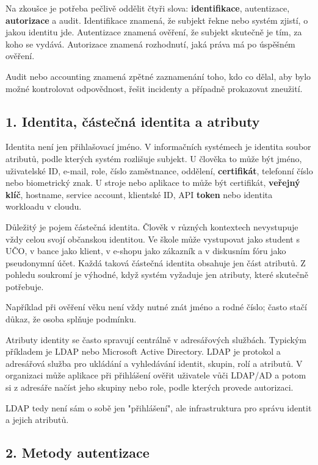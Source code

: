 \documentclass[11pt,a4paper]{article}
\begin{document}
Na zkoušce je potřeba pečlivě oddělit čtyři slova: \textbf{identifikace}, autentizace, \textbf{autorizace} a audit. Identifikace znamená, že subjekt řekne nebo systém zjistí, o jakou identitu jde. Autentizace znamená ověření, že subjekt skutečně je tím, za koho se vydává. Autorizace znamená rozhodnutí, jaká práva má po úspěšném ověření.

Audit nebo accounting znamená zpětné zaznamenání toho, kdo co dělal, aby bylo možné kontrolovat odpovědnost, řešit incidenty a případně prokazovat zneužití.

\subsection*{1. Identita, částečná identita a atributy}

Identita není jen přihlašovací jméno. V informačních systémech je identita soubor atributů, podle kterých systém rozlišuje subjekt. U člověka to může být jméno, uživatelské ID, e-mail, role, číslo zaměstnance, oddělení, \textbf{certifikát}, telefonní číslo nebo biometrický znak. U stroje nebo aplikace to může být certifikát, \textbf{veřejný klíč}, hostname, service account, klientské ID, API \textbf{token} nebo identita workloadu v cloudu.

Důležitý je pojem částečná identita. Člověk v různých kontextech nevystupuje vždy celou svojí občanskou identitou. Ve škole může vystupovat jako student s UČO, v bance jako klient, v e-shopu jako zákazník a v diskusním fóru jako pseudonymní účet. Každá taková částečná identita obsahuje jen část atributů. Z pohledu soukromí je výhodné, když systém vyžaduje jen atributy, které skutečně potřebuje.

Například při ověření věku není vždy nutné znát jméno a rodné číslo; často stačí důkaz, že osoba splňuje podmínku.

Atributy identity se často spravují centrálně v adresářových službách. Typickým příkladem je LDAP nebo Microsoft Active Directory. LDAP je protokol a adresářová služba pro ukládání a vyhledávání identit, skupin, rolí a atributů. V organizaci může aplikace při přihlášení ověřit uživatele vůči LDAP/AD a potom si z adresáře načíst jeho skupiny nebo role, podle kterých provede autorizaci.

LDAP tedy není sám o sobě jen "přihlášení", ale infrastruktura pro správu identit a jejich atributů.

\subsection*{2. Metody autentizace}
\end{document}
